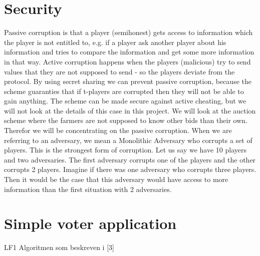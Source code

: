 \section{Security}
Passive corruption is that a player (semihonest) gets access to information which the player is not entitled to, e.g. if a player ask another player about his information and tries to compare the information and get some more information in that way. Active corruption happens when the players (malicious) try to send values that they are not supposed to send - so the players deviate from the protocol. By using secret sharing we can prevent passive corruption, because the scheme guaranties that if t-players are corrupted then they will not be able to gain anything. The scheme can be made secure against active cheating, but we will not look at the details of this case in this project.
We will look at the auction scheme where the farmers are not supposed to know other bids than their own. Therefor we will be concentrating on the passive corruption. 
When we are referring to an adversary, we mean a Monolithic Adversary who corrupts a set of players. This is the strongest form of corruption. Let us say we have 10 players and two adversaries. The first adversary corrupts one of the players and the other corrupts 2 players. Imagine if there was one adversary who corrupts three players. Then it would be the case that this adversary would have access to more information than the first situation with 2 adversaries.
\section{Simple voter application}

\begin{center}
\begin{algorithm}[H]
\caption{LF1 Algoritmen som beskreven i [3]}
\end{algorithm}
\end{center}



